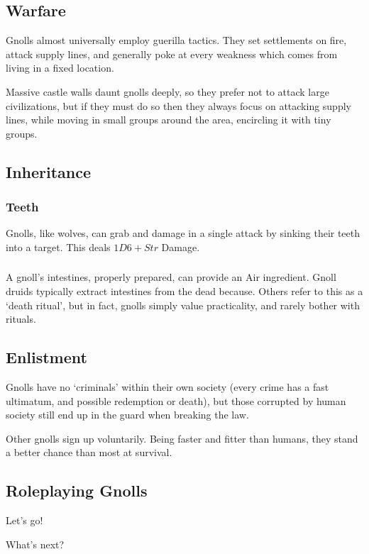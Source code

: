 \begin{multicols}{2}
\subsection{Warfare}

Gnolls almost universally employ guerilla tactics.
They set settlements on fire, attack supply lines, and generally poke at every weakness which comes from living in a fixed location.

Massive castle walls daunt gnolls deeply, so they prefer not to attack large civilizations, but if they must do so then they always focus on attacking supply lines, while moving in small groups around the area, encircling it with tiny groups.

\subsection{Inheritance}

\subsubsection[Teeth: grab and grapple in a single manoeuvre]{Teeth}
\label{gnollishInheritance}

Gnolls, like wolves, can grab and damage in a single attack by sinking their teeth into a target.
This deals $1D6 + Str$ Damage.


\subsubsection{}


A gnoll's intestines, properly prepared, can provide an Air \gls{ingredient}.
Gnoll druids typically extract intestines from the dead because.
Others refer to this as a `death ritual', but in fact, gnolls simply value practicality, and rarely bother with rituals.

\subsection{Enlistment}

Gnolls have no `criminals' within their own society (every crime has a fast ultimatum, and possible redemption or death), but those corrupted by human society still end up in the \gls{guard} when breaking the law.

Other gnolls sign up voluntarily.
Being faster and fitter than humans, they stand a better chance than most at survival.

\subsection{Roleplaying Gnolls}

Let's go!


{\raggedleft What's next?\par}

\end{multicols}

